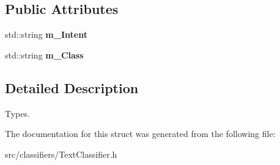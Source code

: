 \subsection*{Public Attributes}
\begin{DoxyCompactItemize}
\item 
\mbox{\label{struct_text_classifier_1_1_intent_class_a3cb2fdaea95db7e733fc91122e717eab}} 
std\+::string {\bfseries m\+\_\+\+Intent}
\item 
\mbox{\label{struct_text_classifier_1_1_intent_class_ac408b25321b0436216179f62286fc568}} 
std\+::string {\bfseries m\+\_\+\+Class}
\end{DoxyCompactItemize}


\subsection{Detailed Description}
Types. 

The documentation for this struct was generated from the following file\+:\begin{DoxyCompactItemize}
\item 
src/classifiers/Text\+Classifier.\+h\end{DoxyCompactItemize}
